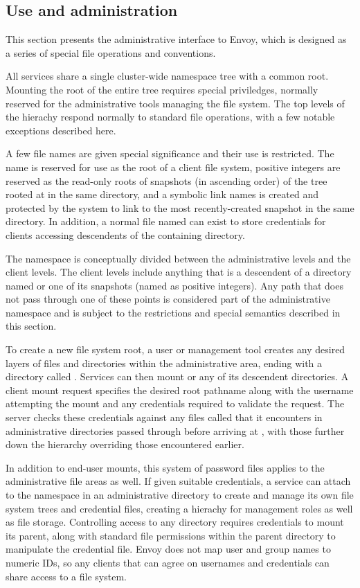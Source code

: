 \subsection{Use and administration}

This section presents the administrative interface to Envoy, which is designed as a series of special file operations and conventions.

All services share a single cluster-wide namespace tree with a common root. Mounting the root of the entire tree requires special priviledges, normally reserved for the administrative tools managing the file system. The top levels of the hierachy respond normally to standard file operations, with a few notable exceptions described here.

A few file names are given special significance and their use is restricted. The name \current is reserved for use as the root of a client file system, positive integers are reserved as the read-only roots of snapshots (in ascending order) of the tree rooted at \current in the same directory, and a symbolic link names \snapshot is created and protected by the system to link to the most recently-created snapshot in the same directory. In addition, a normal file named \password can exist to store credentials for clients accessing descendents of the containing directory.

The namespace is conceptually divided between the administrative levels and the client levels. The client levels include anything that is a descendent of a directory named \current or one of its snapshots (named as positive integers). Any path that does not pass through one of these points is considered part of the administrative namespace and is subject to the restrictions and special semantics described in this section.

To create a new file system root, a user or management tool creates any desired layers of files and directories within the administrative area, ending with a directory called \current. Services can then mount \current or any of its descendent directories. A client mount request specifies the desired root pathname along with the username attempting the mount and any credentials required to validate the request. The server checks these credentials against any files called \password that it encounters in administrative directories passed through before arriving at \current, with those further down the hierarchy overriding those encountered earlier.

In addition to end-user mounts, this system of password files applies to the administrative file areas as well. If given suitable credentials, a service can attach to the namespace in an administrative directory to create and manage its own file system trees and credential files, creating a hierachy for management roles as well as file storage. Controlling access to any directory requires credentials to mount its parent, along with standard file permissions within the parent directory to manipulate the credential file. Envoy does not map user and group names to numeric IDs, so any clients that can agree on usernames and credentials can share access to a file system.

